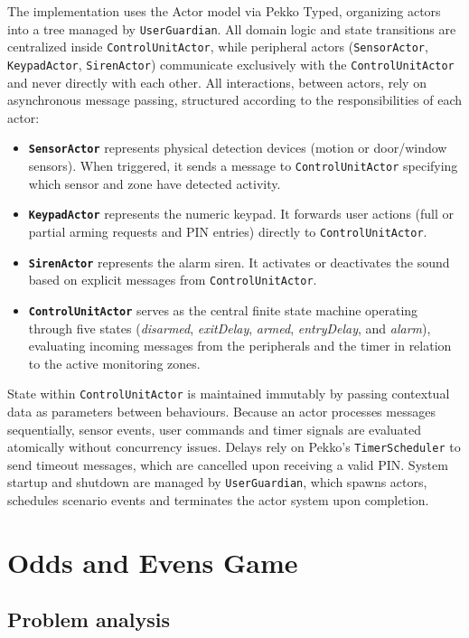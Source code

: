 \documentclass[11pt,a4paper]{article}
\begin{document}
The implementation uses the Actor model via Pekko Typed, organizing actors into a tree managed by \texttt{UserGuardian}. All domain logic and state transitions are centralized inside \texttt{ControlUnitActor}, while peripheral actors (\texttt{SensorActor}, \texttt{KeypadActor}, \texttt{SirenActor}) communicate exclusively with the \texttt{ControlUnitActor} and never directly with each other. All interactions, between actors, rely on asynchronous message passing, structured according to the responsibilities of each actor:
\begin{itemize}
	\item \textbf{\texttt{SensorActor}} represents physical detection devices (motion or door/window sensors). When triggered, it sends a message to \texttt{ControlUnitActor} specifying which sensor and zone have detected activity.
	\item \textbf{\texttt{KeypadActor}} represents the numeric keypad. It forwards user actions (full or partial arming requests and PIN entries) directly to \texttt{ControlUnitActor}.
	\item \textbf{\texttt{SirenActor}} represents the alarm siren. It activates or deactivates the sound based on explicit messages from \texttt{ControlUnitActor}.
	\item \textbf{\texttt{ControlUnitActor}} serves as the central finite state machine operating through five states (\emph{disarmed}, \emph{exitDelay}, \emph{armed}, \emph{entryDelay}, and \emph{alarm}), evaluating incoming messages from the peripherals and the timer in relation to the active monitoring zones.
\end{itemize}

State within \texttt{ControlUnitActor} is maintained immutably by passing contextual data as parameters between behaviours. Because an actor processes messages sequentially, sensor events, user commands and timer signals are evaluated atomically without concurrency issues. Delays rely on Pekko's \texttt{TimerScheduler} to send timeout messages, which are cancelled upon receiving a valid PIN. System startup and shutdown are managed by \texttt{UserGuardian}, which spawns actors, schedules scenario events and terminates the actor system upon completion.

\section{Odds and Evens Game}

\subsection{Problem analysis}
\end{document}
